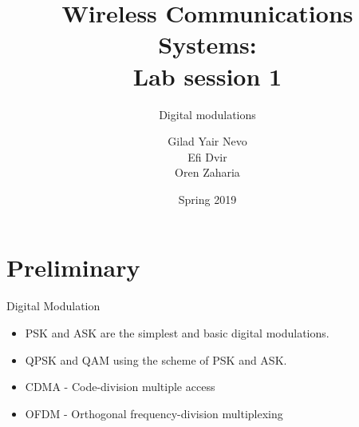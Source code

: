 \documentclass{beamer}
\title{Wireless Communications \\Systems: \\ Lab session 1}
\subtitle{Digital modulations}
\author{Gilad Yair Nevo \\ Efi Dvir \\ Oren Zaharia}
\institute{Communication Systems Engineering \\ Ben-Gurion University}
\date{Spring 2019}
\begin{document}

\begin{frame}
	\maketitle %
\end{frame}


\section{Preliminary} %


\begin{frame}{Digital Modulation}
	\begin{itemize}
	    \item PSK and ASK  are the simplest and basic digital modulations.
	    \item QPSK and QAM using the scheme of PSK and ASK.
	    \item CDMA - Code-division multiple access
        \item OFDM - Orthogonal frequency-division multiplexing 
	\end{itemize}
\end{frame}

\end{document}
